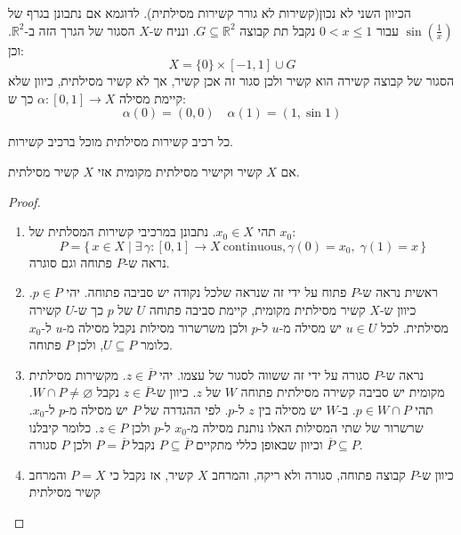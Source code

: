 \documentclass{tstextbook}
\begin{document}
\begin{remark}
הכיוון השני לא נכון(קשירות לא גורר קשירות מסילתית). לדוגמא אם נתבונן בגרף של \(\sin\left( \frac{1}{x} \right)\) עבור \(0<x\leq 1\) נקבל תת קבוצה \(G\subseteq \mathbb{R}^{2}\). ונניח ש-\(X\) הסגור של הגרך הזה ב-\(\mathbb{R}^{2}\). וכן:
$$X=\{ 0 \}\times[-1,1]\cup  G$$
הסגור של קבוצה קשירה הוא קשיר ולכן סגור זה אכן קשיר, אך לא קשיר מסילתית, כיוון שלא קיימת מסילה \(\alpha:[0,1]\to X\) כך ש:
$$\alpha(0)=(0,0)\quad \alpha(1)=(1,\sin 1)$$

\end{remark}
\begin{corollary}
כל רכיב קשירות מסילתית מוכל ברכיב קשירות.

\end{corollary}
\begin{proposition}
אם \(X\) קשיר וקישיר מסילתית מקומית אזי \(X\) קשיר מסילתית.

\end{proposition}
\begin{proof}
  \begin{enumerate}
    \item תהי \(x_{0} \in X\). נתבונן במרכיבי קשירות המסלתית של \(x_{0}\): 
$$P=\{\,x\in X\mid\exists\,\gamma:[0,1]\to X{\mathrm{~continuous}},\gamma(0)=x_{0},\;\gamma(1)=x\,\}$$
נראה ש-\(P\) פתוחה וגם סוגרה.


    \item ראשית נראה ש-\(P\) פתוח על ידי זה שנראה שלכל נקודה יש סביבה פתוחה. יהי \(p \in P\). כיוון ש-\(X\) קשיר מסילתית מקומית, קיימת סביבה פתוחה \(U\) של \(p\) כך ש-\(U\) קשירה מסילתית. לכל \(u \in U\) יש מסילה מ-\(u\) ל-\(p\) ולכן משרשרור מסילות נקבל מסילה מ-\(u\) ל-\(x_{0}\) כלומר \(U\subseteq P\), ולכן \(P\) פתוחה. 


    \item נראה ש-\(P\) סגורה על ידי זה ששווה לסגור של עצמו. יהי \(z \in \overline{P}\). מקשירות מסילתית מקומית יש סביבה קשירה מסילתית פתוחה \(W\) של \(z\). כיוון ש-\(z \in \overline{P}\) נקבל \(W \cap P \neq \varnothing\). תהי \(p \in W\cap P\). ב-\(W\) יש מסילה בין \(z\) ל-\(p\). לפי ההגדרה של \(P\) יש מסילה מ-\(p\) ל-\(x_{0}\). שרשרור של שתי המסילות האלו נותנת מסילה מ-\(x_{0}\) ל-\(p\) ולכן \(z \in P\). כלומר קיבלנו \(\overline{P}\subseteq P\) וכיוון שבאופן כללי מתקיים \(P\subseteq \overline{P}\) נקבל \(P=\overline{P}\) ולכן \(P\) סגורה. 


    \item כיוון ש-\(P\) קבוצה פתוחה, סגורה ולא ריקה, והמרחב \(X\) קשיר, אז נקבל כי \(P=X\) והמרחב קשיר מסילתית 


  \end{enumerate}
\end{proof}
\end{document}

